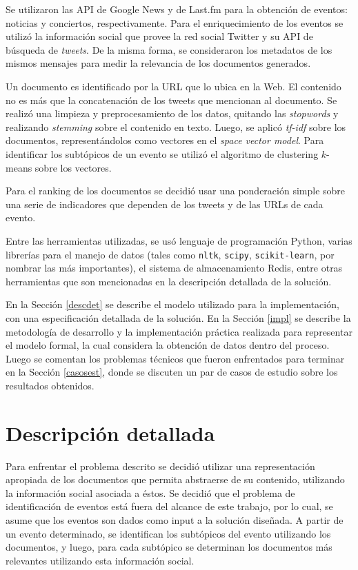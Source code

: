 \documentclass[upright, contnum]{umemoria}
\begin{document}
  Se utilizaron las API de Google News y de Last.fm para la
  obtención de eventos: noticias y conciertos, respectivamente. Para
  el enriquecimiento de los eventos se utilizó la información social
  que provee la red social Twitter y su API de búsqueda de
  \emph{tweets}. De la misma forma, se consideraron los metadatos de los
  mismos mensajes para medir la relevancia de los documentos generados. 
  
  Un documento es identificado por la URL que lo ubica en la Web. El
  contenido no es más que la concatenación de los tweets que
  mencionan al documento. Se realizó una limpieza y preprocesamiento
  de los datos, quitando las \emph{stopwords} y realizando \emph{stemming}
  sobre el contenido en texto. Luego, se aplicó \emph{tf-idf} sobre los
  documentos, representándolos como vectores en el \emph{space vector   model}. Para identificar los subtópicos de un evento se utilizó el 
  algoritmo de clustering $k$-means sobre los vectores. 
  
  Para el ranking de los documentos se decidió usar una ponderación
  simple sobre una serie de indicadores que dependen de los tweets y
  de las URLs de cada evento.
  
  Entre las herramientas utilizadas, se usó lenguaje de
  programación Python, varias librerías para el manejo de datos
  (tales como \texttt{nltk}, \texttt{scipy}, \texttt{scikit-learn}, por nombrar las más
  importantes), el sistema de almacenamiento Redis, entre otras
  herramientas que son mencionadas en la descripción detallada de la
  solución.
  
  En la Sección \ref{descdet} se describe el modelo utilizado para la
  implementación, con una especificación detallada de la solución. En la
  Sección \ref{impl} se describe la metodología de desarrollo y la
  implementación práctica realizada para representar el modelo
  formal, la cual considera la obtención de datos dentro del
  proceso. Luego se comentan los problemas técnicos que fueron
  enfrentados para terminar en la Sección \ref{casosest}, donde se discuten
  un par de casos de estudio sobre los resultados obtenidos.


\section{Descripción detallada}
\label{sec-4.1}

\label{descdet}


   Para enfrentar el problema descrito se decidió utilizar una
   representación apropiada de los documentos que permita abstraerse
   de su contenido, utilizando la información social asociada a
   éstos. Se decidió que el problema de identificación de eventos está
   fuera del alcance de este trabajo, por lo cual, se asume que los
   eventos son dados como input a la solución diseñada. A partir de un
   evento determinado, se identifican los  subtópicos del evento
   utilizando los documentos, y luego, para cada 
   subtópico se determinan los documentos más relevantes utilizando
   esta información social.
\end{document}
